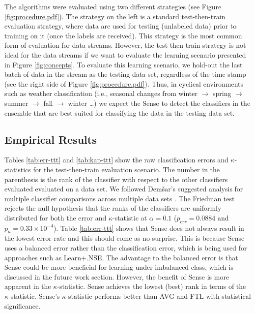 \documentclass[10pt, conference]{IEEEtran}
\begin{document}
The algorithms were evaluated using two different strategies (see Figure \ref{fig:procedure.pdf}). The strategy on the left is a standard test-then-train evaluation strategy, where data are used for testing (unlabeled data) prior to training on it (once the labels are received). This strategy is the most common form of evaluation for data streams. However, the test-then-train strategy is not ideal for the data streams if we want to evaluate the learning scenario presented in Figure \ref{fig:concepts}. To evaluate this learning scenario, we hold-out the last batch of data in the stream as the testing data set, regardless of the time stamp (see the right side of Figure \ref{fig:procedure.pdf}). Thus, in cyclical environments such as weather classification (i.e., seasonal changes from winter $\rightarrow$ spring $\rightarrow$ summer $\rightarrow$ fall $\rightarrow$ winter \ldots) we expect the Sense to detect the classifiers in the ensemble that are best suited for classifying the data in the testing data set. 



\subsection{Empirical Results}


Tables \ref{tab:err-ttt} and \ref{tab:kap-ttt} show the raw classification errors and $\kappa$-statistics for the test-then-train evaluation scenario. The number in the parenthesis is the rank of the classifier with respect to the other classifiers evaluated evaluated on a data set. We followed  Dem{\v s}ar's suggested analysis for multiple classifier comparisons across multiple data sets \cite{Demsar2006JMLR}. The Friedman test rejects the null hypothesis that the ranks of the classifiers are uniformly distributed for both the error and $\kappa$-statistic at $\alpha=0.1$ ($p_{err} = 0.0884$ and $p_{\kappa} = 0.33 \times 10^{-4}$). 
Table \ref{tab:err-ttt} shows that Sense does not always result in the lowest error rate and this should come as no surprise. This is because Sense uses a balanced error rather than the  classification error, which is being used for approaches such as Learn\++.NSE. The advantage to the balanced error is that Sense could be more beneficial for learning under imbalanced class, which is discussed in the future work section. 
However, the benefit of Sense is more apparent in the $\kappa$-statistic. Sense achieves the lowest (best) rank in terms of the  $\kappa$-statistic. Sense's $\kappa$-statistic performs better than AVG and FTL with statistical significance.
\end{document}
